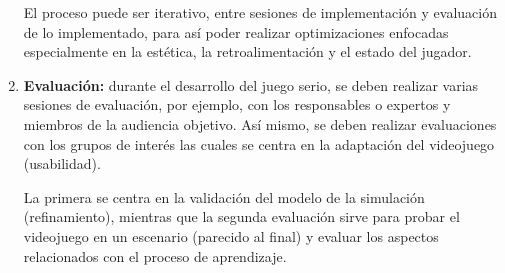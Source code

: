 \begin{enumerate}
El proceso puede ser iterativo, entre sesiones de implementación y evaluación de
lo implementado, para así poder realizar optimizaciones enfocadas especialmente
en la estética, la retroalimentación y el estado del jugador.

\item \textbf{Evaluación:} durante el desarrollo del juego serio, se deben
    realizar varias sesiones de evaluación, por ejemplo, con los responsables o
    expertos y miembros de la audiencia objetivo. Así mismo, se deben realizar
    evaluaciones con los grupos de interés las cuales se centra en la adaptación
    del videojuego (usabilidad). 

La primera se centra en la validación del modelo de la simulación
(refinamiento), mientras que la segunda evaluación sirve para probar el videojuego en
un escenario (parecido al final) y evaluar los aspectos relacionados con el
proceso de aprendizaje.  

\end{enumerate}

